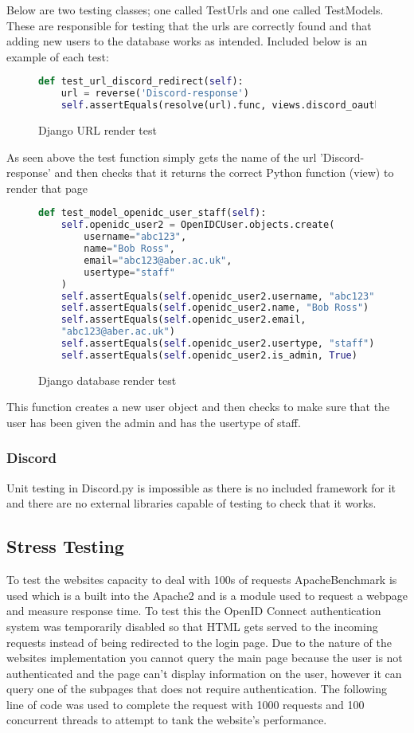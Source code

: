 Below are two testing classes; one called TestUrls and one called TestModels. These are responsible for testing that the urls are correctly found and that adding new users to the database works as intended. Included below is an example of each test:

\begin{figure}[H]
\begin{lstlisting}[language=Python]
def test_url_discord_redirect(self):
    url = reverse('Discord-response')
    self.assertEquals(resolve(url).func, views.discord_oauth2_redirect)
\end{lstlisting}
\caption{Django URL render test}
\label{fig:django-url}
\end{figure}
As seen above the test function simply gets the name of the url 'Discord-response' and then checks that it returns the correct Python function (view) to render that page

\begin{figure}[H]
\begin{lstlisting}[language=Python]
def test_model_openidc_user_staff(self):
    self.openidc_user2 = OpenIDCUser.objects.create(
        username="abc123",
        name="Bob Ross",
        email="abc123@aber.ac.uk",
        usertype="staff"
    )
    self.assertEquals(self.openidc_user2.username, "abc123")
    self.assertEquals(self.openidc_user2.name, "Bob Ross")
    self.assertEquals(self.openidc_user2.email, 
    "abc123@aber.ac.uk")
    self.assertEquals(self.openidc_user2.usertype, "staff")
    self.assertEquals(self.openidc_user2.is_admin, True)
\end{lstlisting}
\caption{Django database render test}
\label{fig:django-database}
\end{figure}
This function creates a new user object and then checks to make sure that the user has been given the admin and has the usertype of staff.

\subsubsection{Discord}
Unit testing in Discord.py is impossible as there is no included framework for it and there are no external libraries capable of testing to check that it works.

\subsection{Stress Testing}
To test the websites capacity to deal with 100s of requests ApacheBenchmark \cite{apacheBenchmark} is used which is a built into the Apache2 \cite{apache2} and is a module used to request a webpage and measure response time. To test this the OpenID Connect \cite{OpenID} authentication system  was temporarily disabled so that HTML gets served to the incoming requests instead of being redirected to the login page. Due to the nature of the websites implementation you cannot query the main page because the user is not authenticated and the page can't display information on the user, however it can query one of the subpages that does not require authentication. The following line of code was used to complete the request with 1000 requests and 100 concurrent threads to attempt to tank the website's performance.

